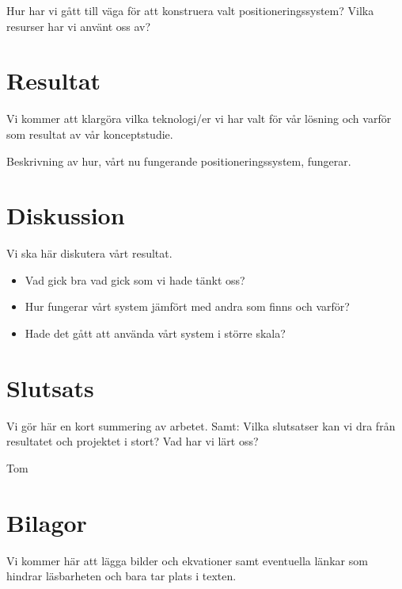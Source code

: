 \documentclass{article}
\begin{document}
Hur har vi gått till väga för att konstruera valt positioneringssystem?
Vilka resurser har vi använt oss av?


\section{Resultat}
Vi kommer att klargöra vilka teknologi/er vi har valt för vår lösning och varför som resultat av vår konceptstudie.

Beskrivning av hur, vårt nu fungerande positioneringssystem, fungerar. 


\section{Diskussion}
Vi ska här diskutera vårt resultat.
\begin{itemize}
\item Vad gick bra vad gick som vi hade tänkt oss?
\item Hur fungerar vårt system jämfört med andra som finns och varför?
\item Hade det gått att använda vårt system i större skala?
\end{itemize} 




\section{Slutsats}
Vi gör här en kort summering av arbetet.
Samt:
Vilka slutsatser kan vi dra från resultatet och projektet i stort?
Vad har vi lärt oss?






\newpage
\begin{thebibliography}{99}

 Tom

\end{thebibliography}

\section{Bilagor}
Vi kommer här att lägga bilder och ekvationer samt eventuella länkar som hindrar läsbarheten och bara tar plats i texten.
\end{document}
